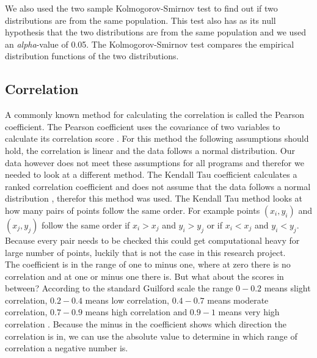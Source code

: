 We also used the two sample Kolmogorov-Smirnov test to find out if two distributions are from the same population. This test also has as its null hypothesis that the two distributions are from the same population and we used an \textit{alpha}-value of 0.05. The Kolmogorov-Smirnov test compares the empirical distribution functions of the two distributions.

\subsection{Correlation}
A commonly known method for calculating the correlation is called the Pearson coefficient. The Pearson coefficient uses the covariance of two variables to calculate its correlation score \cite{pearson1929some}. For this method the following assumptions should hold, the correlation is linear and the data follows a normal distribution. Our data however does not meet these assumptions for all programs and therefor we needed to look at a different method. The Kendall Tau coefficient calculates a ranked correlation coefficient and does not assume that the data follows a normal distribution \cite{kendall1938new}, therefor this method was used. The Kendall Tau method looks at how many pairs of points follow the same order. For example points $(x_i, y_i)$ and $(x_j, y_j)$ follow the same order if $x_i > x_j$ and $y_i > y_j$ or if $x_i < x_j$ and $y_i < y_j$. Because every pair needs to be checked this could get computational heavy for large number of points, luckily that is not the case in this research project.\\

The coefficient is in the range of one to minus one, where at zero there is no correlation and at one or minus one there is. But what about the scores in between? According to the standard Guilford scale the range $0-0.2$ means slight correlation, $0.2-0.4$ means low correlation, $0.4-0.7$ means moderate correlation, $0.7-0.9$ means high correlation and $0.9-1$ means very high correlation \cite{guilford1950fundamental}. Because the minus in the coefficient shows which direction the correlation is in, we can use the absolute value to determine in which range of correlation a negative number is. 


